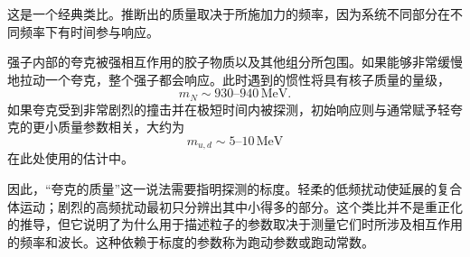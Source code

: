 这是一个经典类比。推断出的质量取决于所施加力的频率，因为系统不同部分在不同频率下有时间参与响应。

强子内部的夸克被强相互作用的胶子物质以及其他组分所包围。如果能够非常缓慢地拉动一个夸克，整个强子都会响应。此时遇到的惯性将具有核子质量的量级，
\begin{equation}
m_N\sim930\text{--}940\,\mathrm{MeV}.
\end{equation}
如果夸克受到非常剧烈的撞击并在极短时间内被探测，初始响应则与通常赋予轻夸克的更小质量参数相关，大约为
\begin{equation}
m_{u,d}\sim5\text{--}10\,\mathrm{MeV}
\end{equation}
在此处使用的估计中。

因此，``夸克的质量''这一说法需要指明探测的标度。轻柔的低频扰动使延展的复合体运动；剧烈的高频扰动最初只分辨出其中小得多的部分。这个类比并不是重正化的推导，但它说明了为什么用于描述粒子的参数取决于测量它们时所涉及相互作用的频率和波长。这种依赖于标度的参数称为跑动参数或跑动常数。

\begin{classroomqa}
\end{classroomqa}

\begin{classroomqa}
\end{classroomqa}

\begin{classroomqa}
\end{classroomqa}


\begin{classroomqa}
\end{classroomqa}

